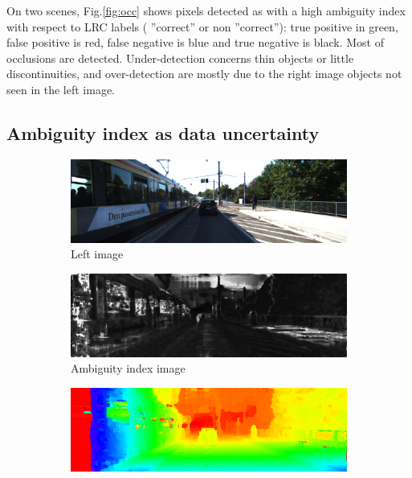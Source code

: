 \documentclass{article}
\begin{document}
On two scenes, Fig.\ref{fig:occ} shows pixels detected as with a high ambiguity index with respect to LRC labels ( ''correct'' or non ''correct''): true positive in green, false positive is red, false negative is blue and true negative is black. Most of occlusions are detected. Under-detection concerns thin objects or little discontinuities, and over-detection are mostly due to the right image objects not seen in the left image.

\subsection{Ambiguity index as data uncertainty}

\begin{figure}
\centering
        \begin{subfigure}[t]{0.98\linewidth}
                \includegraphics[width=0.99\linewidth]{Figures/144_10_il}
                \caption{Left image}
        \end{subfigure}
        \begin{subfigure}[t]{0.98\linewidth}
                \includegraphics[width=0.99\linewidth]{Figures/144_10_ml2}
                \caption{Ambiguity index image}
        \end{subfigure}
        \begin{subfigure}[t]{0.98\linewidth}
                \includegraphics[width=0.99\linewidth]{Figures/144_10_df}

\end{subfigure}
\end{figure}
\end{document}
